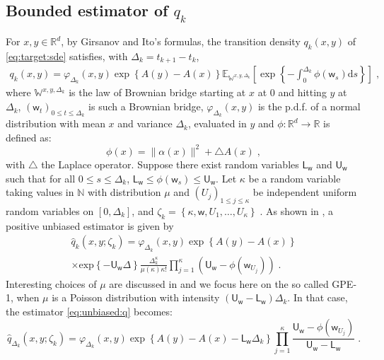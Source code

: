 \documentclass[12pt,draft]{article}
\newcommand{\rmd}{\mathrm{d}}
\newcommand{\eqsp}{\;}
\newcommand{\1}{\mathrm{1}}
\newcommand{\mw}{\mathsf{w}}%
\newcommand{\U}{\mathsf{U}}
\newcommand{\Lo}{\mathsf{L}}
\begin{document}
\subsection*{Bounded estimator of $q_k$}
For $x, y \in \mathbb{R}^d$, by Girsanov and Ito's formulas, the transition density $q_k(x,y)$ of \eqref{eq:target:sde} satisfies, with $\Delta_k = t_{k+1}-t_k$,
\begin{align*}
q_k(x,y)=\varphi_{\Delta_k}(x,y)\exp\left\lbrace A(y)-A(x)\right\rbrace \mathbb{E}_{\mathbb{W}^{x,y,\Delta_k}}\left[ \exp \left\lbrace - \int_0^{\Delta_k} \phi(\mw_s)\rmd s \right\rbrace \right]\eqsp,
\end{align*}
where $\mathbb{W}^{x,y,\Delta_k}$ is the law of Brownian bridge starting at $x$ at 0 and hitting $y$ at $\Delta_k$, $(\mw_t)_{0\leq t \leq \Delta_k}$ is such a Brownian bridge, $\varphi_{\Delta_k}(x,y)$ is the p.d.f. of a normal distribution with mean $x$ and variance $\Delta_k$, evaluated in $y$ and $\phi:\mathbb{R}^d\to\mathbb{R}$ is defined as:
\[
\phi(x) =\|\alpha(x)\|^2  + \triangle A(x)\eqsp,
\]
with $\triangle$ the Laplace operator.
Suppose there exist random variables $\Lo_\mw$ and $\U_\mw$ such that for all $0\leq s \leq \Delta_k$, $\Lo_\mw \leq \phi(\mw_s)\leq \U_\mw$.
Let $\kappa$ be a random variable taking values in $\mathbb{N}$ with distribution $\mu$ and $(U_j)_{1\le j\le \kappa}$ be independent uniform random variables on $[0,\Delta_k]$, and $
\zeta_k = \left\{\kappa,\mw,U_1,\ldots,U_\kappa\right\}\eqsp$. 
As shown in \cite{fearnhead:papaspiliopoulos:roberts:2008}, a positive unbiased estimator is given by 
\begin{multline}
\widehat{q}_k(x,y;\zeta_k) = \varphi_{\Delta_k}(x,y) \exp \left\{A(y) - A(x)\right\}\\ 
\times\mathrm{exp}\left\{-\U_\mw\Delta\right\}\frac{\Delta_k^{\kappa}}{\mu(\kappa)\kappa!}\prod_{j=1}^{\kappa}\left(\U_\mw-\phi(\mw_{U_j})\right)\eqsp.\label{eq:unbiased:q}
\end{multline}
Interesting choices of $\mu$ are discussed in \cite{fearnhead:papaspiliopoulos:roberts:2008} and we focus here on the so called GPE-1, when $\mu$ is a Poisson distribution with intensity $(\U_\mw-\Lo_\mw)\Delta_k$. In that case, the estimator \eqref{eq:unbiased:q} becomes:
\begin{equation}
\widehat{q}_{\Delta_k}(x,y;\zeta_k) = \varphi_{\Delta_k}(x,y) \exp \left\{A(y) - A(x)- \Lo_\mw\Delta_k \right\}\prod_{j=1}^{\kappa}\frac{\U_\mw-\phi(\mw_{U_j})}{\U_\mw-\Lo_\mw}\eqsp.\label{eq:GPE1}
\end{equation}
\end{document}
